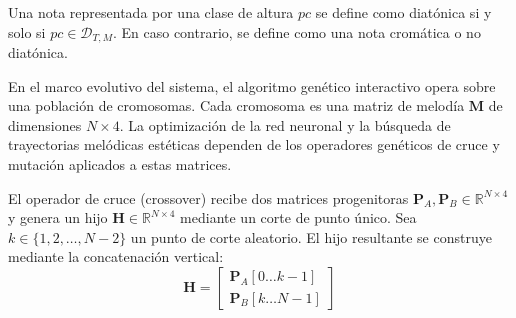 \documentclass[12pt]{report}
\begin{document}
Una nota representada por una clase de altura $pc$ se define como diatónica si y solo si $pc \in \mathcal{D}_{T,M}$. En caso contrario, se define como una nota cromática o no diatónica.

En el marco evolutivo del sistema, el algoritmo genético interactivo opera sobre una población de cromosomas. Cada cromosoma es una matriz de melodía $\mathbf{M}$ de dimensiones $N \times 4$. La optimización de la red neuronal y la búsqueda de trayectorias melódicas estéticas dependen de los operadores genéticos de cruce y mutación aplicados a estas matrices. 

El operador de cruce (crossover) recibe dos matrices progenitoras $\mathbf{P}_A, \mathbf{P}_B \in \mathbb{R}^{N \times 4}$ y genera un hijo $\mathbf{H} \in \mathbb{R}^{N \times 4}$ mediante un corte de punto único. Sea $k \in \{1, 2, \dots, N-2\}$ un punto de corte aleatorio. El hijo resultante se construye mediante la concatenación vertical:
\begin{equation}
    \mathbf{H} = \begin{bmatrix} \mathbf{P}_A[0 \dots k-1] \\ \mathbf{P}_B[k \dots N-1] \end{bmatrix}
\end{equation}
\end{document}
